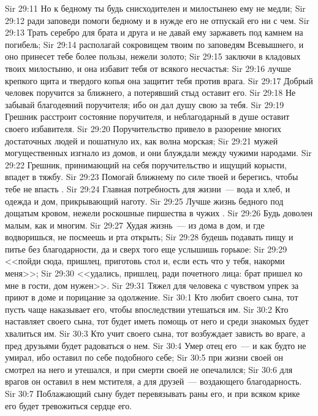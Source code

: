 \vs Sir 29:11 Но к бедному ты будь снисходителен и милостынею ему не медли;
\vs Sir 29:12 ради заповеди помоги бедному и в нужде его не отпускай его ни с чем.
\vs Sir 29:13 Трать серебро для брата и друга и не давай ему заржаветь под камнем на погибель;
\vs Sir 29:14 располагай сокровищем твоим по заповедям Всевышнего, и оно принесет тебе более пользы, нежели золото;
\vs Sir 29:15 заключи в кладовых твоих милостыню, и она избавит тебя от всякого несчастья:
\vs Sir 29:16 лучше крепкого щита и твердого копья она защитит тебя против врага.
\vs Sir 29:17 Добрый человек поручится за ближнего, а потерявший стыд оставит его.
\vs Sir 29:18 Не забывай благодеяний поручителя; ибо он дал душу свою за тебя.
\vs Sir 29:19 Грешник расстроит состояние поручителя, и неблагодарный в душе оставит своего избавителя.
\vs Sir 29:20 Поручительство привело в разорение многих достаточных людей и пошатнуло их, как волна морская;
\vs Sir 29:21 мужей могущественных изгнало из домов, и они блуждали между чужими народами.
\vs Sir 29:22 Грешник, принимающий на себя поручительство и ищущий корысти, впадет в тяжбу.
\vs Sir 29:23 Помогай ближнему по силе твоей и берегись, чтобы тебе не впасть .
\vs Sir 29:24 Главная потребность для жизни~--- вода и хлеб, и одежда и дом, прикрывающий наготу.
\vs Sir 29:25 Лучше жизнь бедного под дощатым кровом, нежели роскошные пиршества в чужих .
\vs Sir 29:26 Будь доволен малым, как и многим.
\vs Sir 29:27 Худая жизнь~---  из дома в дом, и где водворишься, не посмеешь и рта открыть;
\vs Sir 29:28 будешь подавать пищу и питье без благодарности, да и сверх того еще услышишь горькое:
\vs Sir 29:29 <<пойди сюда, пришлец, приготовь стол и, если есть что у тебя, накорми меня>>;
\vs Sir 29:30 <<удались, пришлец, ради почетного лица: брат пришел ко мне в гости, дом нужен>>.
\vs Sir 29:31 Тяжел для человека с чувством упрек за приют в доме и порицание за одолжение.
\vs Sir 30:1 Кто любит своего сына, тот пусть чаще наказывает его, чтобы впоследствии утешаться им.
\vs Sir 30:2 Кто наставляет своего сына, тот будет иметь помощь от него и среди знакомых будет хвалиться им.
\vs Sir 30:3 Кто учит своего сына, тот возбуждает зависть во враге, а пред друзьями будет радоваться о нем.
\vs Sir 30:4 Умер отец его~--- и как будто не умирал, ибо оставил по себе подобного себе;
\vs Sir 30:5 при жизни своей он смотрел на него и утешался, и при смерти своей не опечалился;
\vs Sir 30:6 для врагов он оставил в нем мстителя, а для друзей~--- воздающего благодарность.
\vs Sir 30:7 Поблажающий сыну будет перевязывать раны его, и при всяком крике его будет тревожиться сердце его.
